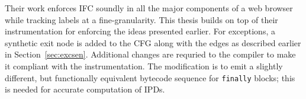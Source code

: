 Their work enforces IFC soundly in all the major components of 
a web browser while tracking labels at a fine-granularity. This thesis 
builds on top of their instrumentation for enforcing the ideas presented 
earlier. For exceptions, a synthetic exit node is added to the CFG
along with the edges as described earlier in
Section~\ref{sec:excsen}. Additional changes are requried to the
compiler to make it compliant with the instrumentation. The
modification is to emit a slightly different, but functionally
equivalent bytecode sequence for \texttt{finally} blocks; 
this is needed for accurate computation of IPDs. 






